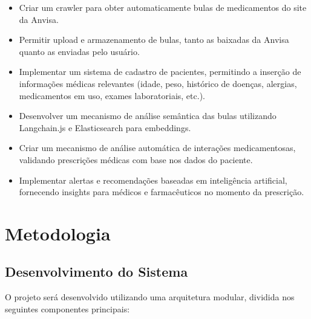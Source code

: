 \begin{itemize}
    \item Criar um crawler para obter automaticamente bulas de medicamentos do site da Anvisa.
    \item Permitir upload e armazenamento de bulas, tanto as baixadas da Anvisa quanto as enviadas pelo usuário.
    \item Implementar um sistema de cadastro de pacientes, permitindo a inserção de informações médicas relevantes (idade, peso, histórico de doenças, alergias, medicamentos em uso, exames laboratoriais, etc.).
    \item Desenvolver um mecanismo de análise semântica das bulas utilizando Langchain.js e Elasticsearch para embeddings.
    \item Criar um mecanismo de análise automática de interações medicamentosas, validando prescrições médicas com base nos dados do paciente.
    \item Implementar alertas e recomendações baseadas em inteligência artificial, fornecendo insights para médicos e farmacêuticos no momento da prescrição.
\end{itemize}

\section{Metodologia}

\subsection{Desenvolvimento do Sistema}

O projeto será desenvolvido utilizando uma arquitetura modular, dividida nos seguintes componentes principais:

